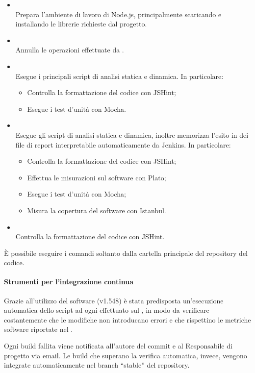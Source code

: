 \begin{itemize}
	\item \textbf{} \\
	Prepara l'ambiente di lavoro di Node.js, principalmente scaricando e installando le librerie richieste dal progetto.
		
	\item \textbf{} \\
	Annulla le operazioni effettuate da .

	\item \textbf{} \\
	Esegue i principali script di analisi statica e dinamica. In particolare:
	\begin{itemize}
	\item Controlla la formattazione del codice con JSHint;
	\item Esegue i test d'unità con Mocha.
	\end{itemize}

	\item \textbf{} \\
	Esegue gli script di analisi statica e dinamica, inoltre memorizza l'esito in dei file di report interpretabile automaticamente da Jenkins. In particolare:
	\begin{itemize}
	\item Controlla la formattazione del codice con JSHint;
	\item Effettua le misurazioni sul software con Plato;
	\item Esegue i test d'unità con Mocha;
	\item Misura la copertura del software con Istanbul.
	\end{itemize}

	\item \textbf{} \\
	Controlla la formattazione del codice con JSHint.
\end{itemize}

È possibile eseguire i comandi soltanto dalla cartella principale del repository del codice.

	\paragraph{Strumenti per l'integrazione continua}
	\label{jenkins}
	
	Grazie all'utilizzo del software \textbf{} (v1.548) è stata predisposta un'esecuzione automatica dello script  ad ogni  effettuato sul , in modo da verificare costantemente che le modifiche non introducano errori e che rispettino le metriche software riportate nel \PianoDiQualifica{}.
	
	Ogni build fallita viene notificata all'autore del commit e al Responsabile di progetto via email. Le build che superano la verifica automatica, invece, vengono integrate automaticamente nel branch ``stable'' del repository.
	